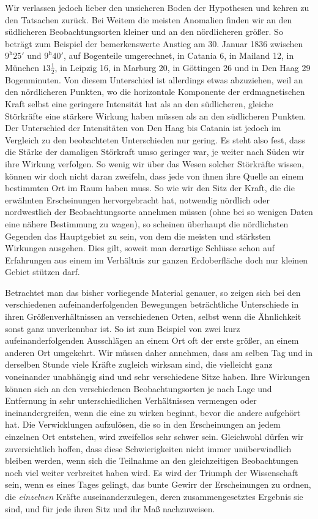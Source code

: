 Wir verlassen jedoch lieber den unsicheren Boden der Hypothesen und kehren zu den Tatsachen zurück. Bei Weitem die meisten Anomalien finden wir an den südlicheren Beobachtungsorten kleiner und an den nördlicheren größer. So beträgt zum Beispiel der bemerkenswerte Anstieg am 30. Januar 1836 zwischen $9^{\mathrm h}25'$ und $9^{\mathrm h}40'$, auf Bogenteile umgerechnet, in Catania 6, in Mailand 12, in München $13\frac12$, in Leipzig 16, in Marburg 20, in Göttingen 26 und in Den Haag 29 Bogenminuten. Von diesem Unterschied ist allerdings etwas abzuziehen, weil an den nördlicheren Punkten, wo die horizontale Komponente der erdmagnetischen Kraft selbst eine geringere Intensität hat als an den südlicheren, gleiche Störkräfte eine stärkere Wirkung haben müssen als an den südlicheren Punkten. Der Unterschied der Intensitäten von Den Haag bis Catania ist jedoch im Vergleich zu den beobachteten Unterschieden nur gering. Es steht also fest, dass
die Stärke der damaligen Störkraft umso geringer war, je weiter nach Süden wir ihre Wirkung verfolgen. So wenig wir über das Wesen solcher Störkräfte wissen, können wir doch nicht daran zweifeln, dass jede von ihnen ihre Quelle an einem bestimmten Ort im Raum haben muss. So wie wir den Sitz der Kraft, die die erwähnten Erscheinungen hervorgebracht hat, notwendig nördlich oder nordwestlich der Beobachtungsorte annehmen müssen (ohne bei so wenigen Daten eine nähere Bestimmung zu wagen), so scheinen überhaupt die nördlichsten Gegenden das Hauptgebiet zu sein, von dem die meisten und stärksten Wirkungen ausgehen. Dies gilt, soweit man derartige Schlüsse schon auf Erfahrungen aus einem im Verhältnis zur ganzen Erdoberfläche doch nur kleinen Gebiet stützen darf.

Betrachtet man das bisher vorliegende Material genauer, so zeigen sich bei den verschiedenen aufeinanderfolgenden Bewegungen beträchtliche Unterschiede in ihren Größenverhältnissen an verschiedenen Orten, selbst wenn die Ähnlichkeit sonst ganz unverkennbar ist. So ist zum Beispiel von zwei kurz aufeinanderfolgenden Ausschlägen an einem Ort oft der erste größer, an einem anderen Ort umgekehrt. Wir müssen daher annehmen, dass am selben Tag und in derselben Stunde viele Kräfte zugleich wirksam sind, die vielleicht ganz voneinander unabhängig sind und sehr verschiedene Sitze haben. Ihre Wirkungen können sich an den verschiedenen Beobachtungsorten je nach Lage und Entfernung in sehr unterschiedlichen Verhältnissen vermengen oder ineinandergreifen, wenn die eine zu wirken beginnt, bevor die andere aufgehört hat. Die Verwicklungen aufzulösen, die so in den Erscheinungen an jedem einzelnen Ort entstehen, wird zweifellos sehr schwer sein. Gleichwohl dürfen wir zuversichtlich hoffen, dass diese Schwierigkeiten nicht immer unüberwindlich bleiben werden, wenn sich die Teilnahme an den gleichzeitigen Beobachtungen noch viel weiter verbreitet haben wird. Es wird der Triumph der Wissenschaft sein, wenn es eines Tages gelingt, das bunte Gewirr der Erscheinungen zu ordnen, die \textit{einzelnen} Kräfte auseinanderzulegen, deren zusammengesetztes Ergebnis sie sind, und für jede ihren Sitz und ihr Maß nachzuweisen.

